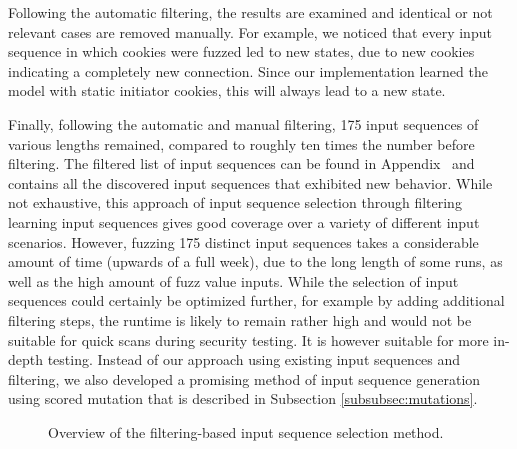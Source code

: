 Following the automatic filtering, the results are examined and identical or not relevant cases are removed manually. For example, we noticed that every input sequence in which cookies were fuzzed led to new states, due to new cookies indicating a completely new connection. Since our implementation learned the model with static initiator cookies, this will always lead to a new state. 

Finally, following the automatic and manual filtering, 175 input sequences of various lengths remained, compared to roughly ten times the number before filtering. The filtered list of input sequences can be found in Appendix~ and contains all the discovered input sequences that exhibited new behavior. While not exhaustive, this approach of input sequence selection through filtering learning input sequences gives good coverage over a variety of different input scenarios. However, fuzzing 175 distinct input sequences takes a considerable amount of time (upwards of a full week), due to the long length of some runs, as well as the high amount of fuzz value inputs. While the selection of input sequences could certainly be optimized further, for example by adding additional filtering steps, the runtime is likely to remain rather high and would not be suitable for quick scans during security testing. It is however suitable for more in-depth testing. Instead of our approach using existing input sequences and filtering, we also developed a promising method of input sequence generation using scored mutation that is described in Subsection \ref{subsubsec:mutations}.

\begin{figure}
\begin{centering}
\caption{Overview of the filtering-based input sequence selection method.}
\label{fig:fuzz_filtering}
\end{centering}
\end{figure}

